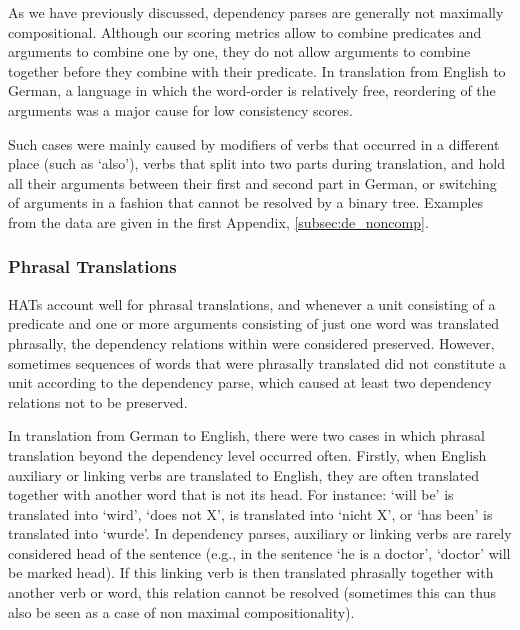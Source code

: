 As we have previously discussed, dependency parses are generally not maximally compositional. Although our scoring metrics allow to combine predicates and arguments to combine one by one, they do not allow arguments to combine together before they combine with their predicate. In translation from English to German, a language in which the word-order is relatively free, reordering of the arguments was a major cause for low consistency scores.

Such cases were mainly caused by modifiers of verbs that occurred in a different place (such as `also'), verbs that split into two parts during translation, and hold all their arguments between their first and second part in German, or switching of arguments in a fashion that cannot be resolved by a binary tree. Examples from the data are given in the first Appendix, \ref{subsec:de_noncomp}.

\subsubsection{Phrasal Translations}

HATs account well for phrasal translations, and whenever a unit consisting of a predicate and one or more arguments consisting of just one word was translated phrasally, the dependency relations within were considered preserved. However, sometimes sequences of words that were phrasally translated did not constitute a unit according to the dependency parse, which caused at least two dependency relations not to be preserved. 

In translation from German to English, there were two cases in which phrasal translation beyond the dependency level occurred often. Firstly, when English auxiliary or linking verbs are translated to English, they are often translated together with another word that is not its head. For instance: `will be' is translated into `wird', `does not X', is translated into `nicht X', or `has been' is translated into `wurde'. In dependency parses, auxiliary or linking verbs are rarely considered head of the sentence (e.g., in the sentence `he is a doctor', `doctor' will be marked head). If this linking verb is then translated phrasally together with another verb or word, this relation cannot be resolved (sometimes this can thus also be seen as a case of non maximal compositionality).

